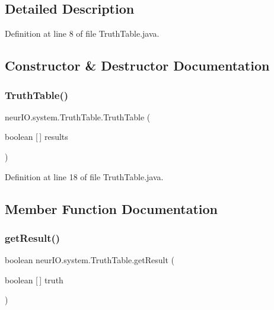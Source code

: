 \subsection{Detailed Description}


Definition at line 8 of file Truth\+Table.\+java.



\subsection{Constructor \& Destructor Documentation}
\mbox{\label{classneur_i_o_1_1system_1_1_truth_table_a9a4e5d68d6f275a51c7af28c5e4f11c2}} 
\subsubsection{\texorpdfstring{Truth\+Table()}{TruthTable()}}
{\footnotesize\ttfamily neur\+I\+O.\+system.\+Truth\+Table.\+Truth\+Table (\begin{DoxyParamCaption}\item[{boolean \mbox{[}$\,$\mbox{]}}]{results }\end{DoxyParamCaption})}



Definition at line 18 of file Truth\+Table.\+java.



\subsection{Member Function Documentation}
\mbox{\label{classneur_i_o_1_1system_1_1_truth_table_a47bb5f7ba445758e1b892e079c501212}} 
\subsubsection{\texorpdfstring{get\+Result()}{getResult()}}
{\footnotesize\ttfamily boolean neur\+I\+O.\+system.\+Truth\+Table.\+get\+Result (\begin{DoxyParamCaption}\item[{boolean \mbox{[}$\,$\mbox{]}}]{truth }\end{DoxyParamCaption})}



